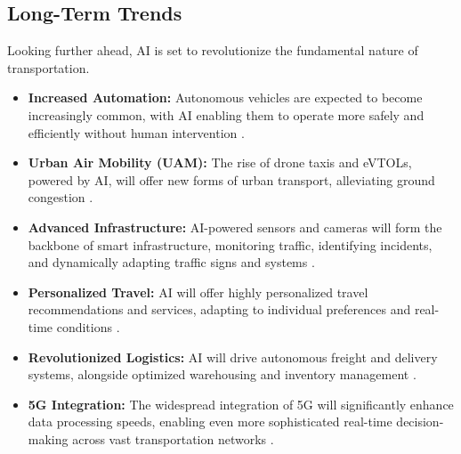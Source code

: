 \subsection{Long-Term Trends}
Looking further ahead, AI is set to revolutionize the fundamental nature of transportation.
\begin{itemize}
    \item \textbf{Increased Automation:} Autonomous vehicles are expected to become increasingly common, with AI enabling them to operate more safely and efficiently without human intervention \cite{InclusionCloud_FutureTrends, PSMarketResearch_FutureTrends}.
    \item \textbf{Urban Air Mobility (UAM):} The rise of drone taxis and eVTOLs, powered by AI, will offer new forms of urban transport, alleviating ground congestion \cite{Prismetric_FutureTrends}.
    \item \textbf{Advanced Infrastructure:} AI-powered sensors and cameras will form the backbone of smart infrastructure, monitoring traffic, identifying incidents, and dynamically adapting traffic signs and systems \cite{CivicIE_FutureTrends}.
    \item \textbf{Personalized Travel:} AI will offer highly personalized travel recommendations and services, adapting to individual preferences and real-time conditions \cite{ITResearches_FutureTrends}.
    \item \textbf{Revolutionized Logistics:} AI will drive autonomous freight and delivery systems, alongside optimized warehousing and inventory management \cite{API4AI_FutureTrends}.
    \item \textbf{5G Integration:} The widespread integration of 5G will significantly enhance data processing speeds, enabling even more sophisticated real-time decision-making across vast transportation networks \cite{AutomateOrg_FutureTrends}.
\end{itemize}

